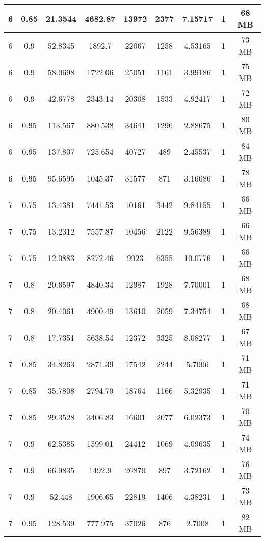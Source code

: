 \begin{longtable}{c|c|c|c|c|c|c|c|c}
  6   &  0.85  &  21.3544  &  4682.87  &  13972  &  2377  &  7.15717  &  1  &  68  MB \\
  \hline
  6   &  0.9   &  52.8345  &  1892.7   &  22067  &  1258  &  4.53165  &  1  &  73  MB \\
  6   &  0.9   &  58.0698  &  1722.06  &  25051  &  1161  &  3.99186  &  1  &  75  MB \\
  6   &  0.9   &  42.6778  &  2343.14  &  20308  &  1533  &  4.92417  &  1  &  72  MB \\
  \hline
  6   &  0.95  &  113.567  &  880.538  &  34641  &  1296  &  2.88675  &  1  &  80  MB \\
  6   &  0.95  &  137.807  &  725.654  &  40727  &  489   &  2.45537  &  1  &  84  MB \\
  6   &  0.95  &  95.6595  &  1045.37  &  31577  &  871   &  3.16686  &  1  &  78  MB \\
  \hline
  7   &  0.75  &  13.4381  &  7441.53  &  10161  &  3442  &  9.84155  &  1  &  66  MB \\
  7   &  0.75  &  13.2312  &  7557.87  &  10456  &  2122  &  9.56389  &  1  &  66  MB \\
  7   &  0.75  &  12.0883  &  8272.46  &  9923   &  6355  &  10.0776  &  1  &  66  MB \\
  \hline
  7   &  0.8   &  20.6597  &  4840.34  &  12987  &  1928  &  7.70001  &  1  &  68  MB \\
  7   &  0.8   &  20.4061  &  4900.49  &  13610  &  2059  &  7.34754  &  1  &  68  MB \\
  7   &  0.8   &  17.7351  &  5638.54  &  12372  &  3325  &  8.08277  &  1  &  67  MB \\
  \hline
  7   &  0.85  &  34.8263  &  2871.39  &  17542  &  2244  &  5.7006   &  1  &  71  MB \\
  7   &  0.85  &  35.7808  &  2794.79  &  18764  &  1166  &  5.32935  &  1  &  71  MB \\
  7   &  0.85  &  29.3528  &  3406.83  &  16601  &  2077  &  6.02373  &  1  &  70  MB \\
  \hline
  7   &  0.9   &  62.5385  &  1599.01  &  24412  &  1069  &  4.09635  &  1  &  74  MB \\
  7   &  0.9   &  66.9835  &  1492.9   &  26870  &  897   &  3.72162  &  1  &  76  MB \\
  7   &  0.9   &  52.448   &  1906.65  &  22819  &  1406  &  4.38231  &  1  &  73  MB \\
  \hline
  7   &  0.95  &  128.539  &  777.975  &  37026  &  876   &  2.7008   &  1  &  82  MB \\

\end{longtable}
